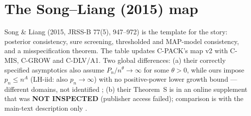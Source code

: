 \section{The Song--Liang (2015) map}\label{sec:map}

Song \& Liang (2015, JRSS-B 77(5), 947--972) is the template for the story: posterior consistency, sure screening, thresholded and MAP-model consistency, and a misspecification theorem. The table updates C-PACK's map v2  with C-MIS, C-GROW and C-DLV/A1. Two global differences: (a) their correctly specified asymptotics also assume $P_n/n^\theta\to\infty$ for some $\theta>0$, while ours impose $p_n\le n^A$ (LH-iid: also $p_n\to\infty$) with no positive-power lower growth bound — different domains, not identified ; (b) their Theorem~S is in an online supplement that was \textbf{NOT INSPECTED} (publisher access failed); comparison is with the main-text description only  .

